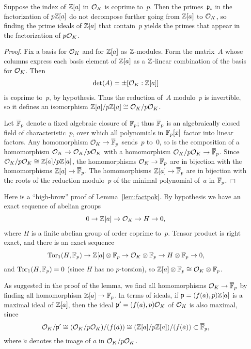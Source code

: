 \begin{lemma}\label{lem:factpok}
Suppose the index of $\mathbb{Z}[a]$ in $\mathcal{O}_K$ is coprime to~$p$.  Then
the primes~$\mathfrak{p}_i$ in the factorization of $p\mathbb{Z}[a]$ do not
decompose further going from $\mathbb{Z}[a]$ to $\mathcal{O}_K$, so finding the
prime ideals of $\mathbb{Z}[a]$ that contain~$p$ yields the primes
that appear in the factorization of $p\mathcal{O}_K$.
\end{lemma}
\begin{proof}
Fix a basis for $\mathcal{O}_K$ and for $\mathbb{Z}[a]$ as $\mathbb{Z}$-modules.
Form the matrix~$A$ whose columns express each basis element
of $\mathbb{Z}[a]$ as a $\mathbb{Z}$-linear combination of the basis for $\mathcal{O}_K$.
Then
$$
\det(A) = \pm [\mathcal{O}_K:\mathbb{Z}[a]]
$$
is coprime to~$p$, by hypothesis.  Thus the reduction of~$A$
modulo~$p$ is invertible, so it defines an isomorphism
$\mathbb{Z}[a]/p\mathbb{Z}[a] \cong \mathcal{O}_K/p\mathcal{O}_K$.

Let $\overline{\mathbb{F}}_p$ denote a fixed algebraic closure of $\mathbb{F}_p$; thus $\overline{\mathbb{F}}_p$
is an algebraically closed field of characteristic~$p$, over which
all polynomials in $\mathbb{F}_p[x]$ factor into linear factors.
Any homomorphism $\mathcal{O}_K\to \overline{\mathbb{F}}_p$ sends~$p$ to~$0$, so is the composition of a homomorphism $\mathcal{O}_K \to \mathcal{O}_K/p\mathcal{O}_K$ with a homomorphism
$\mathcal{O}_K/p\mathcal{O}_K \to \overline{\mathbb{F}}_p$.  Since $\mathcal{O}_K/p\mathcal{O}_K \cong
\mathbb{Z}[a]/p\mathbb{Z}[a]$, the homomorphisms $\mathcal{O}_K\to \overline{\mathbb{F}}_p$ are in bijection
with the homomorphisms $\mathbb{Z}[a]\to \overline{\mathbb{F}}_p$.  The homomorphisms
$\mathbb{Z}[a]\to\overline{\mathbb{F}}_p$ are in bijection with the roots of the reduction
modulo~$p$ of the minimal polynomial of~$a$ in $\overline{\mathbb{F}}_p$.
\end{proof}

\begin{remark}
Here is a ``high-brow'' proof of Lemma~\ref{lem:factpok}.
By hypothesis we have an exact sequence
of abelian groups
$$ 0 \to \mathbb{Z}[a]\to \mathcal{O}_K \to H \to 0,$$
where $H$ is a finite abelian group of order coprime
to~$p$.  Tensor product is right exact, and there is
an exact sequence
$$
   \operatorname{Tor}_1(H,\mathbb{F}_p) \to \mathbb{Z}[a]\otimes\mathbb{F}_p \to \mathcal{O}_K\otimes\mathbb{F}_p \to H\otimes\mathbb{F}_p \to 0,
$$
and $\operatorname{Tor}_1(H,\mathbb{F}_p) = 0$ (since $H$ has no $p$-torsion),
so $\mathbb{Z}[a]\otimes\mathbb{F}_p\cong \mathcal{O}_K\otimes\mathbb{F}_p$.
\end{remark}

As suggested in the proof of the lemma, we find all homomorphisms
$\mathcal{O}_K\to \overline{\mathbb{F}}_p$ by finding all homomorphism $\mathbb{Z}[a]\to \overline{\mathbb{F}}_p$.  In
terms of ideals, if $\mathfrak{p}=(f(a),p)\mathbb{Z}[a]$ is a maximal ideal of $\mathbb{Z}[a]$,
then the ideal $\mathfrak{p}'=(f(a),p)\mathcal{O}_K$ of $\mathcal{O}_K$ is also maximal, since
$$\mathcal{O}_K/\mathfrak{p}'\cong (\mathcal{O}_K/p\mathcal{O}_K)/(f(\tilde{a}))
\cong (\mathbb{Z}[a]/p\mathbb{Z}[a]) / (f(\tilde{a})) \subset \overline{\mathbb{F}}_p,$$
where $\tilde{a}$ denotes the image of $a$ in $\mathcal{O}_K/p\mathcal{O}_K$.

